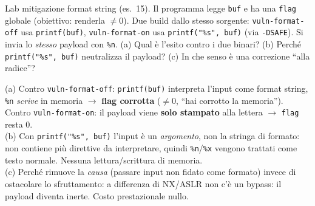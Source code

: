 \question[6]
Lab mitigazione format string (es.\ 15). Il programma legge \lstinline|buf| e ha una \lstinline|flag| globale (obiettivo: renderla $\neq 0$). Due build dallo stesso sorgente: \lstinline|vuln-format-off| usa \lstinline|printf(buf)|, \lstinline|vuln-format-on| usa \lstinline|printf("%s", buf)| (via \lstinline|-DSAFE|). Si invia lo \emph{stesso} payload con \lstinline|%n|.
(a) Qual è l'esito contro i due binari? (b) Perché \lstinline|printf("%s", buf)| neutralizza il payload? (c) In che senso è una correzione ``alla radice''?
\begin{solution}
(a) Contro \lstinline|vuln-format-off|: \lstinline|printf(buf)| interpreta l'input come format string, \lstinline|%n| \emph{scrive} in memoria $\to$ \textbf{flag corrotta} ($\neq 0$, ``hai corrotto la memoria''). Contro \lstinline|vuln-format-on|: il payload viene \textbf{solo stampato} alla lettera $\to$ \lstinline|flag| resta 0.\\
(b) Con \lstinline|printf("%s", buf)| l'input è un \emph{argomento}, non la stringa di formato: non contiene più direttive da interpretare, quindi \lstinline|%n|/\lstinline|%x| vengono trattati come testo normale. Nessuna lettura/scrittura di memoria.\\
(c) Perché rimuove la \emph{causa} (passare input non fidato come formato) invece di ostacolare lo sfruttamento: a differenza di NX/ASLR non c'è un bypass: il payload diventa inerte. Costo prestazionale nullo.
\end{solution}
